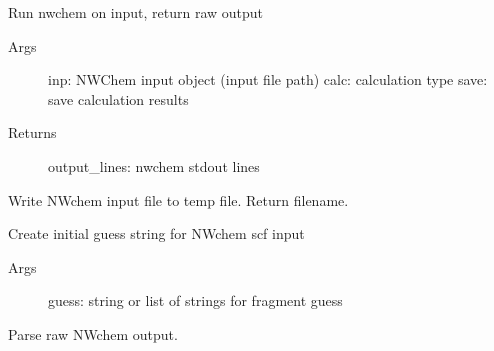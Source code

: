 \documentclass[letterpaper,10pt,english]{sphinxmanual}
\begin{document}
\begin{fulllineitems}
\label{\detokenize{backend:backend.nw.calculate}}
Run nwchem on input, return raw output
\begin{description}
\item[{Args}] \leavevmode
inp: NWChem input object (input file path)
calc: calculation type
save: save calculation results

\item[{Returns}] \leavevmode
output\_lines: nwchem stdout lines

\end{description}

\end{fulllineitems}


\begin{fulllineitems}
\label{\detokenize{backend:backend.nw.inp}}
Write NWchem input file to temp file. Return filename.

\end{fulllineitems}


\begin{fulllineitems}
\label{\detokenize{backend:backend.nw.invecs}}
Create initial guess string for NWchem scf input
\begin{description}
\item[{Args}] \leavevmode
guess: string or list of strings for fragment guess

\end{description}

\end{fulllineitems}


\begin{fulllineitems}
\label{\detokenize{backend:backend.nw.parse}}
Parse raw NWchem output.

\end{fulllineitems}
\end{document}
